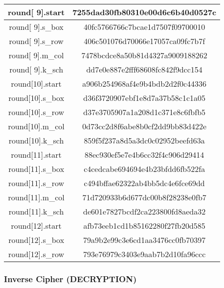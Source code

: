 \begin{center}
\begin{longtable}{|c|c|}
\hline
round[ 9].start& 7255dad30fb80310e00d6c6b40d0527c \\
\hline
round[ 9].s\_box& 40fc5766766c7bcae1d7507f09700010 \\
\hline
round[ 9].s\_row& 406c501076d70066e17057ca09fc7b7f \\
\hline
round[ 9].m\_col& 7478bcdce8a50b81d4327a9009188262 \\
\hline
round[ 9].k\_sch& dd7e0e887e2fff68608fc842f9dcc154 \\
\hline
round[10].start& a906b254968af4e9b4bdb2d2f0c44336 \\
\hline
round[10].s\_box& d36f3720907ebf1e8d7a37b58c1c1a05 \\
\hline
round[10].s\_row& d37e3705907a1a208d1c371e8c6fbfb5 \\
\hline
round[10].m\_col& 0d73cc2d8f6abe8b0cf2dd9bb83d422e \\
\hline
round[10].k\_sch& 859f5f237a8d5a3dc0c02952beefd63a \\
\hline
round[11].start& 88ec930ef5e7e4b6cc32f4c906d29414 \\
\hline
round[11].s\_box& c4cedcabe694694e4b23bfdd6fb522fa \\
\hline
round[11].s\_row& c494bffae62322ab4bb5dc4e6fce69dd \\
\hline
round[11].m\_col& 71d720933b6d677dc00b8f28238e0fb7 \\
\hline
round[11].k\_sch& de601e7827bcdf2ca223800fd8aeda32 \\
\hline
round[12].start& afb73eeb1cd1b85162280f27fb20d585 \\
\hline
round[12].s\_box& 79a9b2e99c3e6cd1aa3476cc0fb70397 \\
\hline
round[12].s\_row& 793e76979c3403e9aab7b2d10fa96ccc \\
\hline
\end{longtable}
\end{center}

\subsubsection{Inverse Cipher (DECRYPTION)}

